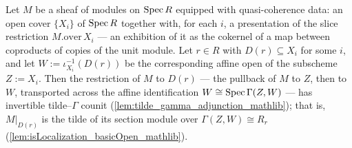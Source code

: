 \begin{lemma}
  \label{lem:isIso_fromTildeΓ_basicOpen_of_quasicoherent}
  \leanok
  Let \(M\) be a sheaf of modules on \(\operatorname{Spec} R\) equipped with quasi-coherence data: an
  open cover \(\{X_i\}\) of \(\operatorname{Spec} R\) together with, for each \(i\), a presentation of
  the slice restriction \(M.\mathrm{over}\,X_i\) — an exhibition of it as the cokernel of
  a map between coproducts of copies of the unit module. Let \(r \in R\) with
  \(D(r) \subseteq X_i\) for some \(i\), and let \(W := \iota_{X_i}^{-1}(D(r))\) be the
  corresponding affine open of the subscheme \(Z := X_i\). Then the restriction of \(M\)
  to \(D(r)\) — the pullback of \(M\) to \(Z\), then to \(W\), transported across the
  affine identification \(W \cong \operatorname{Spec}\Gamma(Z, W)\) — has invertible
  tilde--\(\Gamma\) counit (\cref{lem:tilde_gamma_adjunction_mathlib}); that is,
  \(M|_{D(r)}\) is the tilde of its section module over
  \(\Gamma(Z, W) \cong R_r\) (\cref{lem:isLocalization_basicOpen_mathlib}).
\end{lemma}
